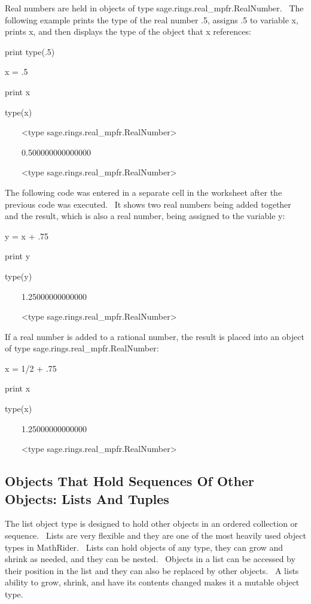 \documentclass[12pt,twoside]{book}
\begin{document}
Real numbers are held in objects of type
sage.rings.real\_mpfr.RealNumber. \ The following example prints the
type of the real number .5, assigns .5 to variable x, prints x, and
then displays the type of the object that x references:

print type(.5)

x = .5

print x

type(x)

{\textbar}

\ \ \ \ {\textless}type
{\textquotesingle}sage.rings.real\_mpfr.RealNumber{\textquotesingle}{\textgreater}

\ \ \ \ 0.500000000000000

\ \ \ \ {\textless}type
{\textquotesingle}sage.rings.real\_mpfr.RealNumber{\textquotesingle}{\textgreater}

The following code was entered in a separate cell in the worksheet after
the previous code was executed. \ It shows two real numbers being added
together and the result, which is also a real number, being assigned to
the variable y:

y = x + .75

print y

type(y)

{\textbar}

\ \ \ \ 1.25000000000000

\ \ \ \ {\textless}type
{\textquotesingle}sage.rings.real\_mpfr.RealNumber{\textquotesingle}{\textgreater}

If a real number is added to a rational number, the result is placed
into an object of type sage.rings.real\_mpfr.RealNumber:


\bigskip

x = 1/2 + .75

print x

type(x)

{\textbar}

\ \ \ \ 1.25000000000000

\ \ \ \ {\textless}type
{\textquotesingle}sage.rings.real\_mpfr.RealNumber{\textquotesingle}{\textgreater}

\subsection[Objects That Hold Sequences Of Other Objects: Lists And Tuples]{
Objects That Hold Sequences Of Other Objects: Lists And Tuples}

The list object type is designed to hold other objects in an ordered
collection or sequence. \ Lists are very flexible and they are one of
the most heavily used object types in MathRider. \ Lists can hold
objects of any type, they can grow and shrink as needed, and they can
be nested. \ Objects in a list can be accessed by their position in the
list and they can also be replaced by other objects. \ A
list{\textquotesingle}s ability to grow, shrink, and have its contents
changed makes it a mutable object type.
\end{document}
